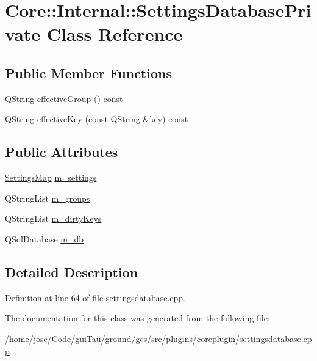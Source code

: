 \hypertarget{class_core_1_1_internal_1_1_settings_database_private}{\section{Core\-:\-:Internal\-:\-:Settings\-Database\-Private Class Reference}
\label{class_core_1_1_internal_1_1_settings_database_private}
}
\subsection*{Public Member Functions}
\begin{DoxyCompactItemize}
\item 
\hyperlink{group___u_a_v_objects_plugin_gab9d252f49c333c94a72f97ce3105a32d}{Q\-String} \hyperlink{group___core_plugin_gae3c0ac37ac92027db10ed8e4217f60db}{effective\-Group} () const 
\item 
\hyperlink{group___u_a_v_objects_plugin_gab9d252f49c333c94a72f97ce3105a32d}{Q\-String} \hyperlink{group___core_plugin_gaa39731470013be66184cff522fd02a62}{effective\-Key} (const \hyperlink{group___u_a_v_objects_plugin_gab9d252f49c333c94a72f97ce3105a32d}{Q\-String} \&key) const 
\end{DoxyCompactItemize}
\subsection*{Public Attributes}
\begin{DoxyCompactItemize}
\item 
\hyperlink{group___core_plugin_ga82251e6825f9c8021ae18f52f510c3fa}{Settings\-Map} \hyperlink{group___core_plugin_ga2e1146040679e3c513138629c976013c}{m\-\_\-settings}
\item 
Q\-String\-List \hyperlink{group___core_plugin_ga11cf6b95abf91ec2970fdffe567cab68}{m\-\_\-groups}
\item 
Q\-String\-List \hyperlink{group___core_plugin_gaf906b80bb9481d156e6d4f69bc0e52b3}{m\-\_\-dirty\-Keys}
\item 
Q\-Sql\-Database \hyperlink{group___core_plugin_gae73eea4c76a3fc8182d9b75d0e1c0438}{m\-\_\-db}
\end{DoxyCompactItemize}


\subsection{Detailed Description}


Definition at line 64 of file settingsdatabase.\-cpp.



The documentation for this class was generated from the following file\-:\begin{DoxyCompactItemize}
\item 
/home/jose/\-Code/gui\-Tau/ground/gcs/src/plugins/coreplugin/\hyperlink{settingsdatabase_8cpp}{settingsdatabase.\-cpp}\end{DoxyCompactItemize}
